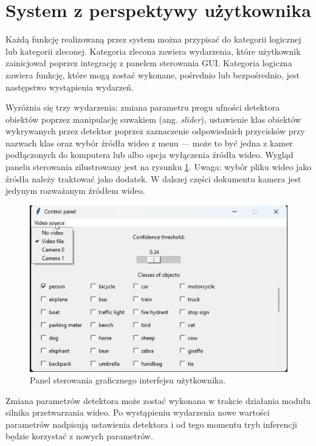 \section{System z perspektywy użytkownika}
\label{chap:uzytkownik-gui}
Każdą funkcję realizowaną przez system można przypisać do kategorii logicznej lub kategorii zleconej. Kategoria zlecona zawiera wydarzenia, które użytkownik zainicjował poprzez integrację z panelem sterowania GUI. Kategoria logiczna zawiera funkcję, które mogą zostać wykonane, pośrednio lub bezpośrednio, jest następstwo wystąpienia wydarzeń.

Wyróżnia się trzy wydarzenia: zmiana parametru progu ufności detektora obiektów poprzez manipulację suwakiem (ang. \emph{slider}), ustawienie klas obiektów wykrywanych przez detektor poprzez zaznaczenie odpowiednich przycisków przy nazwach klas oraz wybór źródła wideo z menu --- może to być jedna z kamer podłączonych do komputera lub albo opcja wyłączenia źródła wideo. Wygląd panelu sterowania zilustrowany jest na rysunku \ref{fig:panel-sterowania}. 
Uwaga: wybór pliku wideo jako źródła należy traktować jako dodatek. W dalszej części dokumentu kamera jest jedynym rozważanym źródłem wideo.   

\begin{figure}[H]
    \centering
    \includegraphics[width=\linewidth]{r_implementacja/panel_sterowania/panel.jpg}
    \caption{Panel sterowania graficznego interfejsu użytkownika.}
    \label{fig:panel-sterowania}
\end{figure}

Zmiana parametrów detektora może zostać wykonana w trakcie działania modułu silnika przetwarzania wideo. Po wystąpieniu wydarzenia nowe wartości parametrów nadpisują ustawienia detektora i od tego momentu tryb inferencji będzie korzystać z nowych parametrów.

